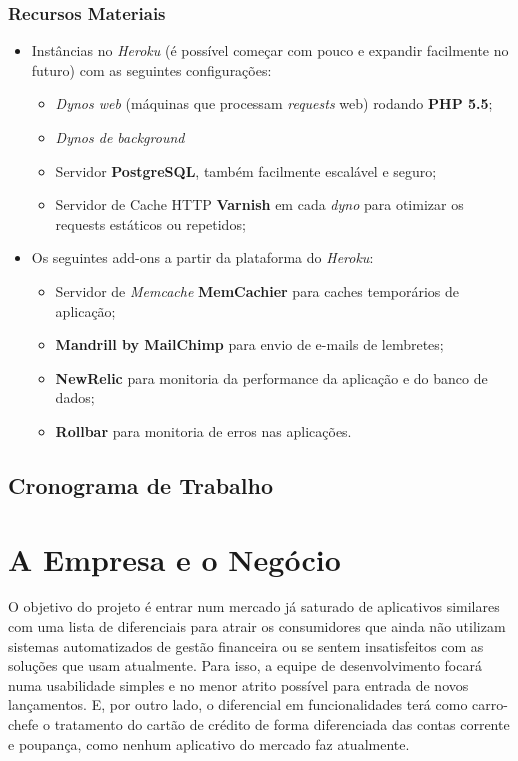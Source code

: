 \documentclass[a4paper]{abnt}
\begin{document}
\subsection*{Recursos Materiais}
\begin{itemize}
	\item Instâncias no \emph{Heroku} (é possível começar com pouco e expandir facilmente no futuro\cite{heroku}) com as seguintes configurações:
	\begin{itemize}
		\item \emph{Dynos web} (máquinas que processam \emph{requests} web) rodando \textbf{PHP 5.5};
		\item \emph{Dynos de background} 
		\item Servidor \textbf{PostgreSQL}, também facilmente escalável e seguro\cite{heroku-pgsql};
		\item Servidor de Cache HTTP \textbf{Varnish} em cada \emph{dyno} para otimizar os requests estáticos ou repetidos;
	\end{itemize}
	
	\item Os seguintes add-ons a partir da plataforma do \emph{Heroku}:
	\begin{itemize}
		\item Servidor de \emph{Memcache} \textbf{MemCachier} para caches temporários de aplicação;
		\item \textbf{Mandrill by MailChimp} para envio de e-mails de lembretes;
		\item \textbf{NewRelic} para monitoria da performance da aplicação e do banco de dados;
		\item \textbf{Rollbar} para monitoria de erros nas aplicações.
	\end{itemize}
\end{itemize}

\section{Cronograma de Trabalho}

%
%


\chapter{A Empresa e o Negócio}
O objetivo do projeto é entrar num mercado já saturado de aplicativos similares com uma lista de diferenciais para atrair os consumidores que ainda não utilizam sistemas automatizados de gestão financeira ou se sentem insatisfeitos com as soluções que usam atualmente. Para isso, a equipe de desenvolvimento focará numa usabilidade simples e no menor atrito possível para entrada de novos lançamentos. E, por outro lado, o diferencial em funcionalidades terá como carro-chefe o tratamento do cartão de crédito de forma diferenciada das contas corrente e poupança, como nenhum aplicativo do mercado faz atualmente.
\end{document}
